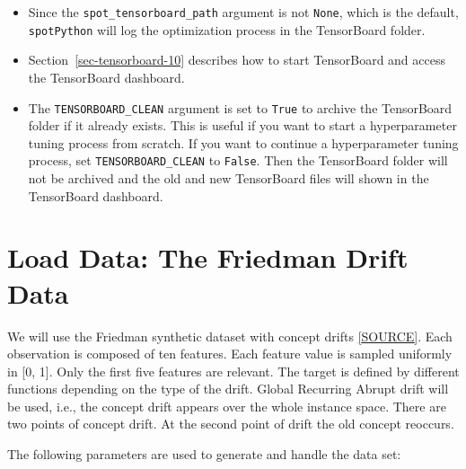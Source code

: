 \documentclass[
  letterpaper,
  DIV=11,
  numbers=noendperiod]{scrreprt}
\providecommand{\tightlist}{%
  \setlength{\itemsep}{0pt}\setlength{\parskip}{0pt}}\usepackage{longtable,booktabs,array}
\begin{document}
\begin{tcolorbox}[enhanced jigsaw, coltitle=black, bottomrule=.15mm, breakable, toprule=.15mm, colframe=quarto-callout-tip-color-frame, title=\textcolor{quarto-callout-tip-color}{\faLightbulb}\hspace{0.5em}{Tip: TensorBoard}, colbacktitle=quarto-callout-tip-color!10!white, opacityback=0, left=2mm, leftrule=.75mm, colback=white, rightrule=.15mm, bottomtitle=1mm, toptitle=1mm, titlerule=0mm, arc=.35mm, opacitybacktitle=0.6]

\begin{itemize}
\tightlist
\item
  Since the \texttt{spot\_tensorboard\_path} argument is not
  \texttt{None}, which is the default, \texttt{spotPython} will log the
  optimization process in the TensorBoard folder.
\item
  Section~\ref{sec-tensorboard-10} describes how to start TensorBoard
  and access the TensorBoard dashboard.
\item
  The \texttt{TENSORBOARD\_CLEAN} argument is set to \texttt{True} to
  archive the TensorBoard folder if it already exists. This is useful if
  you want to start a hyperparameter tuning process from scratch. If you
  want to continue a hyperparameter tuning process, set
  \texttt{TENSORBOARD\_CLEAN} to \texttt{False}. Then the TensorBoard
  folder will not be archived and the old and new TensorBoard files will
  shown in the TensorBoard dashboard.
\end{itemize}

\end{tcolorbox}

\section{Load Data: The Friedman Drift
Data}\label{load-data-the-friedman-drift-data}

We will use the Friedman synthetic dataset with concept drifts
\href{https://riverml.xyz/0.18.0/api/datasets/synth/FriedmanDrift/}{{[}SOURCE{]}}.
Each observation is composed of ten features. Each feature value is
sampled uniformly in {[}0, 1{]}. Only the first five features are
relevant. The target is defined by different functions depending on the
type of the drift. Global Recurring Abrupt drift will be used, i.e., the
concept drift appears over the whole instance space. There are two
points of concept drift. At the second point of drift the old concept
reoccurs.

The following parameters are used to generate and handle the data set:
\end{document}
